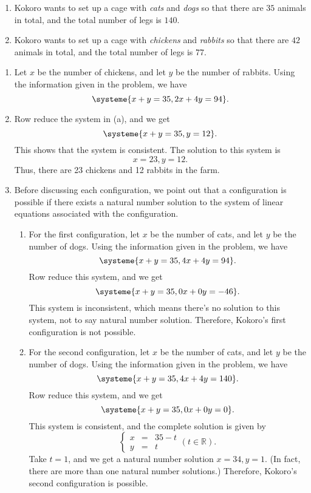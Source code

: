 \begin{exercises}
\begin{problist}
\begin{enumerate}
\begin{enumerate}
					\item Kokoro wants to set up a cage with \emph{cats} and
						\emph{dogs} so that there are $35$ animals in total, and
						the total number of legs is $140$.

					\item Kokoro wants to set up a cage with \emph{chickens} and
						\emph{rabbits} so that there are $42$ animals in total,
						and the total number of legs is $77$.
				\end{enumerate}
		\end{enumerate}
		\begin{solution}
			\begin{enumerate}
				\item Let $x$ be the number of chickens, and let $y$ be the
					number of rabbits. Using the information given in the problem,
					we have
					\[
						\systeme{x+y=35, 2x+4y=94}.
					\]

				\item Row reduce the system in (a), and we get
					\[
						\systeme{x+y=35, y=12}.
					\]
					This shows that the system is consistent. The solution to this
					system is
					\[
						x=23, y=12.
					\]
					Thus, there are 23 chickens and 12 rabbits in the farm.

				\item Before discussing each configuration, we point out that a
					configuration is possible if there exists a natural number
					solution to the system of linear equations associated with
					the configuration.
					\begin{enumerate}
						\item For the first configuration, let $x$ be the number
							of cats, and let $y$ be the number of dogs. Using
							the information given in the problem, we have
							\[
								\systeme{x+y=35, 4x+4y=94}.
							\]
							Row reduce this system, and we get
							\[
								\systeme{x+y=35, 0x+0y=-46}.
							\]
							This system is inconsistent, which means there's no solution
							to this system, not to say natural number solution. Therefore,
							Kokoro's first configuration is not possible.

						\item For the second configuration, let $x$ be the
							number of cats, and let $y$ be the number of dogs.
							Using the information given in the problem, we have
							\[
								\systeme{x+y=35, 4x+4y=140}.
							\]
							Row reduce this system, and we get
							\[
								\systeme{x+y=35, 0x+0y=0}.
							\]
							This system is consistent, and the complete solution
							is given by
							\[
								\left\{
								\begin{array}
									{ccc} x & = & 35-t \\ y & = & t
								\end{array}\right. (t\in \mathbb{R}).
							\]
							Take $t=1$, and we get a natural number solution
							$x=34,y=1$. (In fact, there are more than one natural
							number solutions.) Therefore, Kokoro's second
							configuration is possible.


\end{enumerate}
\end{enumerate}
\end{solution}
\end{problist}
\end{exercises}
